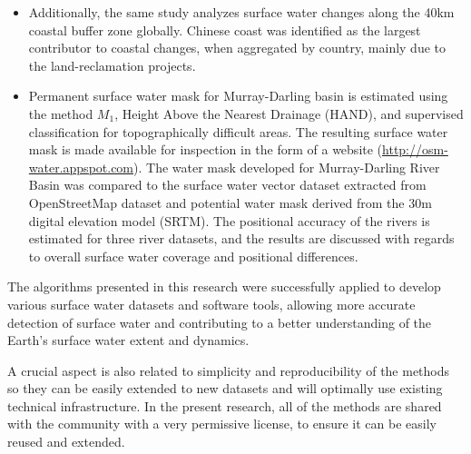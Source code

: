 \begin{itemize}
	\item Additionally, the same study analyzes surface water changes along the 40km coastal buffer zone globally. Chinese coast was identified as the largest contributor to coastal changes, when aggregated by country, mainly due to the land-reclamation projects.
	
	\begin{comment}
	\item The first 30m, nearly-global HAND dataset was developed, derived from NASA/USGS Shuttle Radar Topography Mission (SRTM) digital elevation model and HydroBASINS dataset (\url{http://global-hand.appspot.com}). A homogenized, equal-size version of HydroBASINS dataset was generated to support parallel delineation of the drainage network, drainage directions and flow accumulation to generate global HAND dataset. We discuss the applicability of HAND and other hydrological datasets as auxiliary data to improve surface water detection in topographically challenging areas. We discuss the value of HAND dataset to identify errors in SRTM and its use for water classification in topographically complex areas. 
	\end{comment}
	
	\item Permanent surface water mask for Murray-Darling basin is estimated using the method $M_1$, Height Above the Nearest Drainage (HAND), and supervised classification for topographically difficult areas. The resulting surface water mask is made available for inspection in the form of a website (\url{http://osm-water.appspot.com}). The water mask developed for Murray-Darling River Basin was compared to the surface water vector dataset extracted from OpenStreetMap dataset and potential water mask derived from the 30m digital elevation model (SRTM). The positional accuracy of the rivers is estimated for three river datasets, and the results are discussed with regards to overall surface water coverage and positional differences.    
\end{itemize}

The algorithms presented in this research were successfully applied to develop various surface water datasets and software tools, allowing more accurate detection of surface water and contributing to a better understanding of the Earth's surface water extent and dynamics.

A crucial aspect is also related to simplicity and reproducibility of the methods so they can be easily extended to new datasets and will optimally use existing technical infrastructure. In the present research, all of the methods are shared with the community with a very permissive license, to ensure it can be easily reused and extended.

